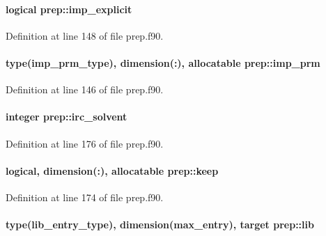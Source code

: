 \hypertarget{classprep_a6de36f3182c32c9e273c5a54632112f7}{
\paragraph[{imp\-\_\-explicit}]{\setlength{\rightskip}{0pt plus 5cm}logical prep\-::imp\-\_\-explicit}}\label{classprep_a6de36f3182c32c9e273c5a54632112f7}


Definition at line 148 of file prep.\-f90.

\hypertarget{classprep_ad5c72f6c240f7753aff7bbf36a03dbde}{
\paragraph[{imp\-\_\-prm}]{\setlength{\rightskip}{0pt plus 5cm}type({\bf imp\-\_\-prm\-\_\-type}), dimension(\-:), allocatable prep\-::imp\-\_\-prm}}\label{classprep_ad5c72f6c240f7753aff7bbf36a03dbde}


Definition at line 146 of file prep.\-f90.

\hypertarget{classprep_a47b263321dda7fb6c374e3f622fdf735}{
\paragraph[{irc\-\_\-solvent}]{\setlength{\rightskip}{0pt plus 5cm}integer prep\-::irc\-\_\-solvent}}\label{classprep_a47b263321dda7fb6c374e3f622fdf735}


Definition at line 176 of file prep.\-f90.

\hypertarget{classprep_ade7b1c1c2de355450a64197eefc36d28}{
\paragraph[{keep}]{\setlength{\rightskip}{0pt plus 5cm}logical, dimension(\-:), allocatable prep\-::keep}}\label{classprep_ade7b1c1c2de355450a64197eefc36d28}


Definition at line 174 of file prep.\-f90.

\hypertarget{classprep_a8d289afb3f6d89fbade57a991736cdbc}{
\paragraph[{lib}]{\setlength{\rightskip}{0pt plus 5cm}type({\bf lib\-\_\-entry\-\_\-type}), dimension({\bf max\-\_\-entry}), target prep\-::lib}}\label{classprep_a8d289afb3f6d89fbade57a991736cdbc}


